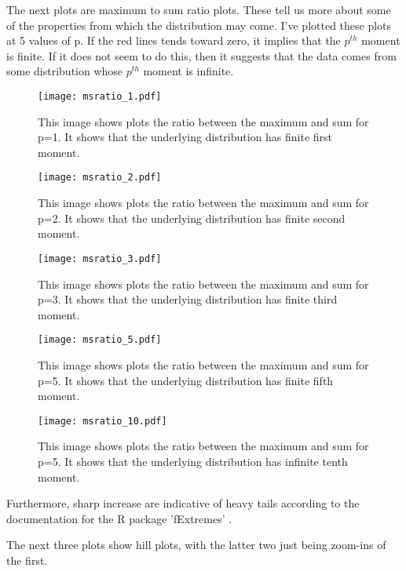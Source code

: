 \documentclass[a4paper]{article}
\begin{document}
The next plots are maximum to sum ratio plots. These tell us more about some of the properties from which the distribution may come. I've plotted these plots at 5 values of p. If the red lines tends toward zero, it implies that the $p^{th}$ moment is finite. If it does not seem to do this, then it suggests that the data comes from some distribution whose $p^{th}$  moment is infinite.

\begin{figure}
\centering
\texttt{[image: msratio\_1.pdf]}
\caption{\label{fig:msratio1} This image shows plots the ratio between the maximum and sum for p=1. It shows that the underlying distribution has finite first moment.}
\end{figure}

\begin{figure}
\centering
\texttt{[image: msratio\_2.pdf]}
\caption{\label{fig:msratio2} This image shows plots the ratio between the maximum and sum for p=2. It shows that the underlying distribution has finite second moment.}
\end{figure}

\begin{figure}
\centering
\texttt{[image: msratio\_3.pdf]}
\caption{\label{fig:msratio3} This image shows plots the ratio between the maximum and sum for p=3. It shows that the underlying distribution has finite third moment.}
\end{figure}

\begin{figure}
\centering
\texttt{[image: msratio\_5.pdf]}
\caption{\label{fig:msratio1} This image shows plots the ratio between the maximum and sum for p=5. It shows that the underlying distribution has finite fifth moment.}
\end{figure}

\begin{figure}
\centering
\texttt{[image: msratio\_10.pdf]}
\caption{\label{fig:msratio10} This image shows plots the ratio between the maximum and sum for p=5. It shows that the underlying distribution has infinite tenth moment.}
\end{figure}

Furthermore, sharp increase are indicative of heavy tails according to the documentation for the R package 'fExtremes' \cite{fExtremes}.

The next three plots show hill plots, with the latter two just being zoom-ins of the first. 
\end{document}
